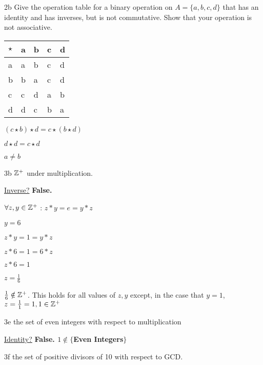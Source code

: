 \begin{question}{2b}
Give the operation table for a binary operation on $A=\{a,b,c,d\}$ that has an identity and has inverses, but is not commutative. Show that your operation is not associative.
\end{question}

\begin{tabular}{l|llll}
$\star$ & a & b & c & d \\
\hline
a       & a & b & c & d \\
b       & b & a & c & d \\
c       & c & d & a & b \\
d       & d & c & b & a
\end{tabular}

$(c \star b) \star d =  c \star (b \star d)$

$d \star d =  c \star d$

$a\neq b$




\begin{question}{3b}
$\mathbb{Z}^+$ under multiplication.
\end{question}

\underline{Inverse?} \textbf{False.}

$\forall z,y \in \mathbb{Z}^+$ : $z * y = e = y * z$

$y=6$

$z * y = 1 = y * z$

$z * 6 = 1 = 6 * z$

$z * 6 = 1 $

$z = \frac{1}{6} $

$\frac{1}{6} \notin \mathbb{Z}^+$. This holds for all values of $z,y$ except, in the case that $y=1$, $z= \frac{1}{1} = 1, 1 \in \mathbb{Z}^+$



\begin{question}{3e}
the set of even integers with respect to multiplication
\end{question}

\underline{Identity?} \textbf{False. $1 \notin \{$Even Integers$\}$}



\begin{question}{3f}
the set of positive divisors of 10 with respect to GCD.
\end{question}

